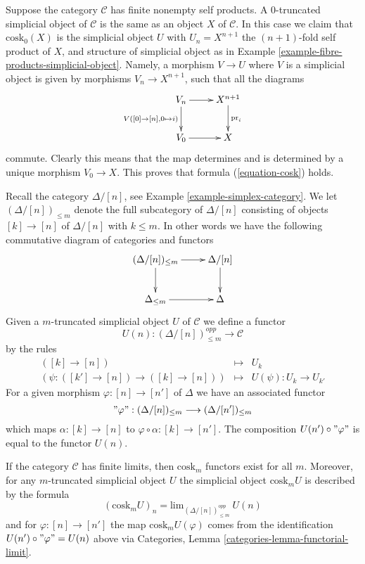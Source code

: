 \begin{example}
\label{example-cosk0}
Suppose the category $\mathcal{C}$ has finite nonempty self products.
A $0$-truncated simplicial object of $\mathcal{C}$ is the same
as an object $X$ of $\mathcal{C}$. In this case
we claim that $\text{cosk}_0(X)$ is the simplicial
object $U$ with $U_n = X^{n + 1}$ the $(n + 1)$-fold self
product of $X$, and structure of simplicial object
as in Example \ref{example-fibre-products-simplicial-object}.
Namely, a morphism $V \to U$ where $V$ is a simplicial
object is given by morphisms $V_n \to X^{n + 1}$, such
that all the diagrams
$$
\xymatrix{
V_n \ar[r] \ar[d]_{V([0] \to [n], 0 \mapsto i)} &
X^{n + 1} \ar[d]^{\text{pr}_i} \\
V_0 \ar[r] &
X
}
$$
commute. Clearly this means that the map determines and is determined
by a unique morphism $V_0 \to X$. This proves that formula
(\ref{equation-cosk}) holds.
\end{example}

\noindent
Recall the category $\Delta/[n]$, see Example \ref{example-simplex-category}.
We let $(\Delta/[n])_{\leq m}$ denote the full subcategory
of $\Delta/[n]$ consisting of objects $[k] \to [n]$
of $\Delta/[n]$ with $k \leq m$. In other words we have
the following commutative diagram of categories and functors
$$
\xymatrix{
(\Delta/[n])_{\leq m} \ar[r] \ar[d] &
\Delta/[n] \ar[d] \\
\Delta_{\leq m} \ar[r] &
\Delta
}
$$
Given a $m$-truncated
simplicial object $U$ of $\mathcal{C}$
we define a functor
$$
U(n) : (\Delta/[n])_{\leq m}^{opp} \longrightarrow \mathcal{C}
$$
by the rules
\begin{eqnarray*}
([k] \to [n]) & \longmapsto & U_k \\
(\psi : ([k'] \to [n]) \to ([k] \to [n])) &
\longmapsto &
U(\psi) : U_k \to U_{k'}
\end{eqnarray*}
For a given morphism $\varphi : [n] \to [n']$ of $\Delta$
we have an associated functor
$$
"\varphi" : (\Delta/[n])_{\leq m} \longrightarrow (\Delta/[n'])_{\leq m}
$$
which maps $\alpha : [k] \to [n]$ to
$\varphi \circ \alpha : [k] \to [n']$.
The composition $U(n') \circ "\varphi"$ is
equal to the functor $U(n)$.

\begin{lemma}
\label{lemma-existence-cosk}
If the category $\mathcal{C}$ has finite limits, then
$\text{cosk}_m$ functors exist for all $m$. Moreover,
for any $m$-truncated simplicial object $U$ the
simplicial object $\text{cosk}_mU$ is described
by the formula
$$
(\text{cosk}_mU)_n = \text{lim}_{(\Delta/[n])_{\leq m}^{opp}}\ U(n)
$$
and for $\varphi : [n] \to [n']$ the map
$\text{cosk}_mU(\varphi)$ comes from the
identification $U(n') \circ "\varphi" = U(n)$ above 
via Categories, Lemma \ref{categories-lemma-functorial-limit}.
\end{lemma}

